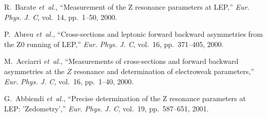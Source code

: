 \documentclass[a4paper,10pt]{article}
\begin{document}
\begin{thebibliography}{99}
R.~Barate {\em et~al.}, ``{Measurement of the Z resonance parameters at LEP},''
  {\em Eur. Phys. J. C}, vol.~14, pp.~1--50, 2000.

P.~Abreu {\em et~al.}, ``{Cross-sections and leptonic forward backward
  asymmetries from the Z0 running of LEP},'' {\em Eur. Phys. J. C}, vol.~16,
  pp.~371--405, 2000.

M.~Acciarri {\em et~al.}, ``{Measurements of cross-sections and forward
  backward asymmetries at the $Z$ resonance and determination of electroweak
  parameters},'' {\em Eur. Phys. J. C}, vol.~16, pp.~1--40, 2000.

G.~Abbiendi {\em et~al.}, ``{Precise determination of the Z resonance
  parameters at LEP: 'Zedometry'},'' {\em Eur. Phys. J. C}, vol.~19,
  pp.~587--651, 2001.
\end{thebibliography}
\end{document}
